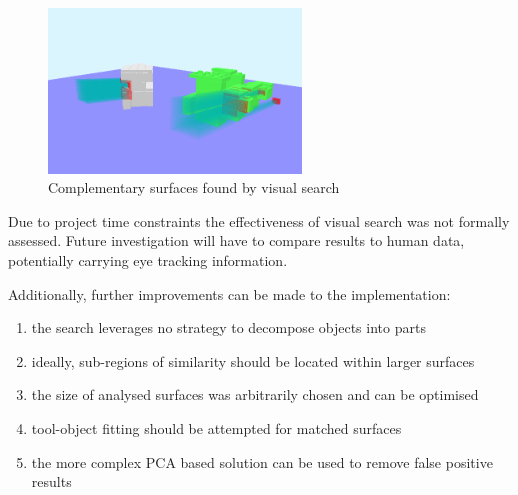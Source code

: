 \documentclass[
    floatsintext
]{article}
\begin{document}
\begin{figure}[h]
  \centering
  \includegraphics[width=0.6\textwidth]{./figures/visual_search.png}
  \caption{Complementary surfaces found by visual search}
  \label{fig:visual_search}
\end{figure}  

Due to project time constraints the effectiveness of visual search was not formally assessed. 
Future investigation will have to compare results to human data, potentially carrying eye tracking information. 

Additionally, further improvements can be made to the implementation:
\begin{enumerate}
   \item the search leverages no strategy to decompose objects into parts 
   \item ideally, sub-regions of similarity should be located within larger surfaces 
   \item the size of analysed surfaces was arbitrarily chosen and can be optimised  
   \item tool-object fitting should be attempted for matched surfaces 
   \item the more complex PCA based solution can be used to remove false positive results 
\end{enumerate}
\end{document}
